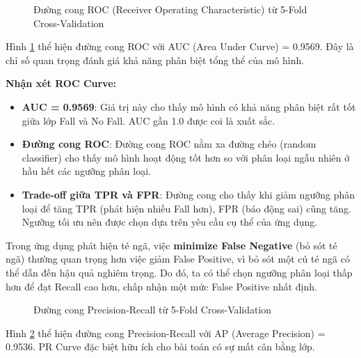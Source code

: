 \vskip 0.5cm

\begin{figure}[hbtp]
    \centering
    \caption[ROC Curve 5-Fold CV]{Đường cong ROC (Receiver Operating Characteristic) từ 5-Fold Cross-Validation}
    \label{fig:roc_curve}
\end{figure}

Hình \ref{fig:roc_curve} thể hiện đường cong ROC với AUC (Area Under Curve) = 0.9569. Đây là chỉ số quan trọng đánh giá khả năng phân biệt tổng thể của mô hình.

\textbf{Nhận xét ROC Curve:}
\begin{itemize}
    \item \textbf{AUC = 0.9569}: Giá trị này cho thấy mô hình có khả năng phân biệt rất tốt giữa lớp Fall và No Fall. AUC gần 1.0 được coi là xuất sắc.
    \item \textbf{Đường cong ROC}: Đường cong ROC nằm xa đường chéo (random classifier) cho thấy mô hình hoạt động tốt hơn so với phân loại ngẫu nhiên ở hầu hết các ngưỡng phân loại.
    \item \textbf{Trade-off giữa TPR và FPR}: Đường cong cho thấy khi giảm ngưỡng phân loại để tăng TPR (phát hiện nhiều Fall hơn), FPR (báo động sai) cũng tăng. Ngưỡng tối ưu nên được chọn dựa trên yêu cầu cụ thể của ứng dụng.
\end{itemize}

Trong ứng dụng phát hiện té ngã, việc \textbf{minimize False Negative} (bỏ sót té ngã) thường quan trọng hơn việc giảm False Positive, vì bỏ sót một cú té ngã có thể dẫn đến hậu quả nghiêm trọng. Do đó, ta có thể chọn ngưỡng phân loại thấp hơn để đạt Recall cao hơn, chấp nhận một mức False Positive nhất định.

\vskip 0.5cm

\begin{figure}[hbtp]
    \centering
    \caption[PR Curve 5-Fold CV]{Đường cong Precision-Recall từ 5-Fold Cross-Validation}
    \label{fig:pr_curve}
\end{figure}

Hình \ref{fig:pr_curve} thể hiện đường cong Precision-Recall với AP (Average Precision) = 0.9536. PR Curve đặc biệt hữu ích cho bài toán có sự mất cân bằng lớp.

